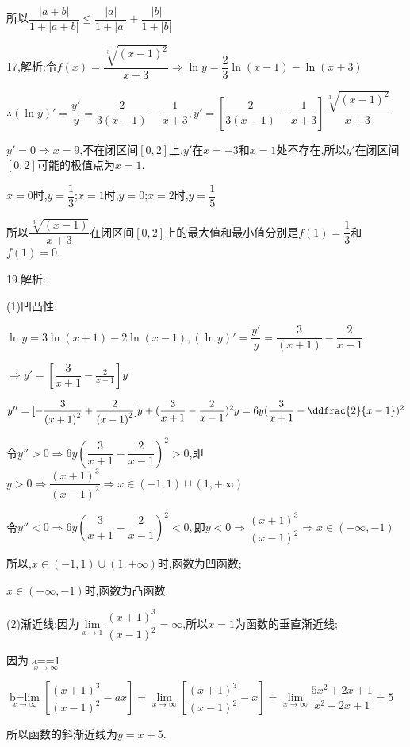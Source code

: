 所以$\dfrac{{\left| {a + b} \right|}}{{1 + \left| {a + b} \right|}} \le \dfrac{{\left| a \right|}}{{1 + \left| a \right|}} + \dfrac{{\left| b \right|}}{{1 + \left| b \right|}}$

17,解析:令$f(x) = \dfrac{{\sqrt[3]{{{{(x - 1)}^2}}}}}{{x + 3}} \Rightarrow \ln y = \dfrac{2}{3}\ln (x - 1) - \ln (x + 3)$

$\therefore (\ln y)' = \dfrac{{y'}}{y} = \dfrac{2}{{3(x - 1)}} - \dfrac{1}{{x + 3}},y' = [\dfrac{2}{{3(x - 1)}} - \dfrac{1}{{x + 3}}]\dfrac{{\sqrt[3]{{{{(x - 1)}^2}}}}}{{x + 3}}$

$y' = 0 \Rightarrow x = 9$,不在闭区间$[0,2]$上.$y'$在$x = - 3$和$x = 1$处不存在,所以$y'$在闭区间$[0,2]$可能的极值点为$x = 1$.

$x = 0$时,$y = \dfrac{1}{3}$;$x = 1$时,$y = 0$;$x = 2$时,$y = \dfrac{1}{5}$

所以$\dfrac{{\sqrt[3]{{(x - 1)}}}}{{x + 3}}$在闭区间$[0,2]$上的最大值和最小值分别是$f(1) = \dfrac{1}{3}$和$f(1) = 0$.

19.解析:

(1)凹凸性:

$\ln y = 3\ln (x + 1) - 2\ln (x - 1),(\ln y)' = \dfrac{{y'}}{y} = \dfrac{3}{{(x + 1)}} - \dfrac{2}{{x - 1}}$

$ \Rightarrow y' = [\dfrac{3}{{x + 1}} - \frac{2}{{x - 1}}]y$

$y'' = [ - \dfrac{3}{{{{(x + 1)}^2}}} + \dfrac{2}{{{{(x - 1)}^2}}}]y + {(\dfrac{3}{{x + 1}} - \dfrac{2}{{x - 1}})^2}y = 6y{(\dfrac{3}{{x + 1}} - \ddfrac{2}{{x - 1}})^2}$

令$y'' > 0 \Rightarrow 6y{(\dfrac{3}{{x + 1}} - \dfrac{2}{{x - 1}})^2} > 0$,即$y > 0 \Rightarrow \dfrac{{{{(x + 1)}^3}}}{{{{(x - 1)}^2}}} \Rightarrow x \in ( - 1,1) \cup (1, + \infty )$

令$y'' < 0 \Rightarrow 6y{(\dfrac{3}{{x + 1}} - \dfrac{2}{{x - 1}})^2} < 0,$即$y < 0 \Rightarrow \dfrac{{{{(x + 1)}^3}}}{{{{(x - 1)}^2}}} \Rightarrow x \in ( - \infty , - 1)$

所以,$x \in ( - 1,1) \cup (1, + \infty )$时,函数为凹函数;

$x \in ( - \infty , - 1)$时,函数为凸函数.

(2)渐近线:因为$\mathop {\lim }\limits_{x \to 1} \dfrac{{{{(x + 1)}^3}}}{{{{(x - 1)}^2}}} = \infty $,所以$x = 1$为函数的垂直渐近线;

因为$\mathop {a = \mathop {\lim }\limits_{x \to \infty } \dfrac{{\dfrac{{{{(x + 1)}^3}}}{{{{(x - 1)}^2}}}}}{x} = 1}\limits_{x \to \infty } $

$\mathop {b = \lim }\limits_{x \to \infty } [\dfrac{{{{(x + 1)}^3}}}{{{{(x - 1)}^2}}} - ax] = \mathop {\lim }\limits_{x \to \infty } [\dfrac{{{{(x + 1)}^3}}}{{{{(x - 1)}^2}}} - x] = \mathop {\lim }\limits_{x \to \infty } \dfrac{{5{x^2} + 2x + 1}}{{{x^2} - 2x + 1}} = 5$

所以函数的斜渐近线为$y = x + 5$.

































